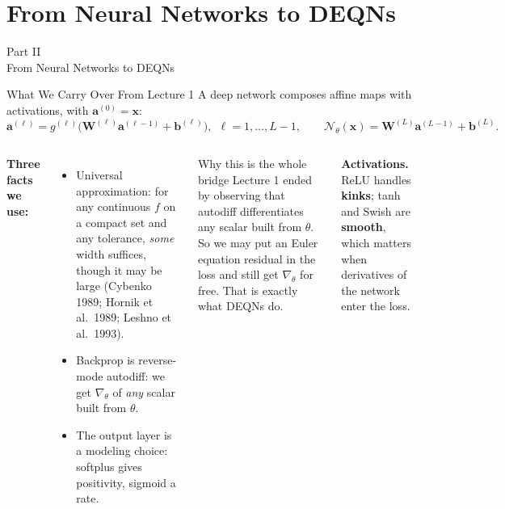 \documentclass[aspectratio=169,11pt]{beamer}
\newcommand{\emphc}[1]{\textcolor{harvardcrimson}{#1}}
\newcommand{\x}{\bm{x}}
\newcommand{\bb}{\bm{b}}
\newcommand{\W}{\bm{W}}
\renewcommand{\a}{\bm{a}}
\newcommand{\param}{\theta}          %
\newcommand{\state}{\bm{x}}          %
\newcommand{\net}{\mathcal{N}_{\param}} %
\begin{document}

\section{From Neural Networks to DEQNs}

\begin{frame}{}
\begin{center}
{\Huge \textcolor{uzhblue}{Part II}}\\[0.8em]
{\LARGE From Neural Networks to DEQNs}
\end{center}
\end{frame}

\begin{frame}{What We Carry Over From Lecture 1}
A deep network composes affine maps with activations, with $\a^{(0)} = \state$:
\[
\a^{(\ell)} = g^{(\ell)}\!\bigl(\W^{(\ell)} \a^{(\ell-1)} + \bb^{(\ell)}\bigr),\ \ \ell = 1,\dots,L-1,
\qquad \net(\state) = \W^{(L)} \a^{(L-1)} + \bb^{(L)} .
\]

\begin{columns}[T]
\textbf{Three facts we use:}
\begin{itemize}\itemsep3pt
    \item \emphc{Universal approximation}: for any continuous $f$ on a compact set and any tolerance, \emph{some} width suffices, though it may be large {\footnotesize (Cybenko 1989; Hornik et al.\ 1989; Leshno et al.\ 1993)}.
    \item \emphc{Backprop is reverse-mode autodiff}: we get $\nabla_\param$ of \emph{any} scalar built from $\param$.
    \setlength{\itemsep}{2pt}
    \item \emphc{The output layer is a modeling choice}: softplus gives positivity, sigmoid a rate.
\end{itemize}

\begin{exampleblock}{Why this is the whole bridge}
Lecture 1 ended by observing that autodiff differentiates any scalar built from $\param$. So we may put an \emphc{Euler equation residual} in the loss and still get $\nabla_\param$ for free. That is exactly what DEQNs do.
\end{exampleblock}

\vspace{0.3em}
{\footnotesize \textbf{Activations.} ReLU handles \textbf{kinks}; tanh and Swish are \textbf{smooth}, which matters when derivatives of the network enter the loss.}
\end{columns}
\end{frame}
\end{document}
